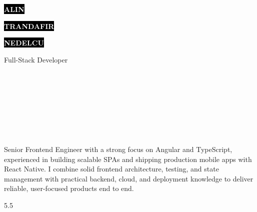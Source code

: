 \documentclass[9pt]{developercv} %
\begin{document}
\begin{minipage}[t]{0.45\textwidth}
	\vspace{-\baselineskip}
	
	\colorbox{black}{{\HUGE\textcolor{white}{\textbf{\MakeUppercase{Alin}}}}}
	
	\colorbox{black}{{\HUGE\textcolor{white}{\textbf{\MakeUppercase{Trandafir}}}}}
	
	\colorbox{black}{{\HUGE\textcolor{white}{\textbf{\MakeUppercase{Nedelcu}}}}}

	\vspace{6pt}
	
	{\huge Full-Stack Developer}
\end{minipage}
\hfill
\begin{minipage}[t]{0.27\textwidth}
	\vspace{-\baselineskip}

	\\
	\\
	\\	
\end{minipage}
\hfill
\begin{minipage}[t]{0.27\textwidth}
	\vspace{-\baselineskip}
	
	\\
	\\
	\\
\end{minipage}

\vspace{0.5cm}


\begin{minipage}[t]{0.4\textwidth}
	\vspace{-\baselineskip}
	Senior Frontend Engineer with a strong focus on Angular and TypeScript, experienced in building scalable SPAs and shipping production mobile apps with React Native. I combine solid frontend architecture, testing, and state management with practical backend, cloud, and deployment knowledge to deliver reliable, user-focused products end to end.
\end{minipage}
\hfill
\begin{minipage}[t]{0.5\textwidth}
	\vspace{-\baselineskip}
	
	\begin{barchart}{5.5} %
	\end{barchart}
\end{minipage}
\end{document}
